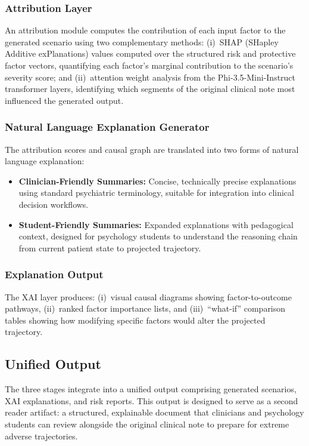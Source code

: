 \documentclass[conference]{IEEEtran}
\begin{document}
\subsubsection{Attribution Layer}
An attribution module computes the contribution of each input factor to the generated scenario using two complementary methods: (i)~SHAP (SHapley Additive exPlanations) values computed over the structured risk and protective factor vectors, quantifying each factor's marginal contribution to the scenario's severity score; and (ii)~attention weight analysis from the Phi-3.5-Mini-Instruct transformer layers, identifying which segments of the original clinical note most influenced the generated output.

\subsubsection{Natural Language Explanation Generator}
The attribution scores and causal graph are translated into two forms of natural language explanation:
\begin{itemize}
\item \textbf{Clinician-Friendly Summaries:} Concise, technically precise explanations using standard psychiatric terminology, suitable for integration into clinical decision workflows.
\item \textbf{Student-Friendly Summaries:} Expanded explanations with pedagogical context, designed for psychology students to understand the reasoning chain from current patient state to projected trajectory.
\end{itemize}

\subsubsection{Explanation Output}
The XAI layer produces: (i)~visual causal diagrams showing factor-to-outcome pathways, (ii)~ranked factor importance lists, and (iii)~``what-if'' comparison tables showing how modifying specific factors would alter the projected trajectory.

\subsection{Unified Output}
The three stages integrate into a unified output comprising generated scenarios, XAI explanations, and risk reports. This output is designed to serve as a second reader artifact: a structured, explainable document that clinicians and psychology students can review alongside the original clinical note to prepare for extreme adverse trajectories.
\end{document}
